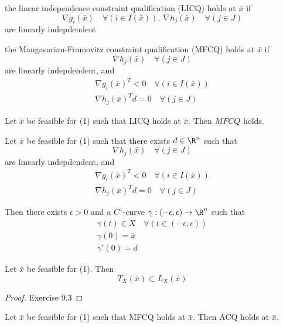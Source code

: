 \begin{enumerata}
	\item the linear independence constraint qualification (LICQ) holds
	at $\bar x$ if
	$$
		\nabla g_i(\bar x)\quad\forall(i\in I(\bar x)),\ \nabla h_j(\bar x)\quad\forall(j\in J)
	$$
	are linearly indepdendent
	\item the Mangasarian-Fromovitz constraint qualification (MFCQ)
	holds at $\bar x$ if
	$$
		\nabla h_j(\bar x)\quad\forall(j\in J)
	$$
	are linearly indepdendent, and
	\begin{gather*}
		\nabla g_i(\bar x)^T < 0  \quad\forall(i\in I(\bar x))\\
		\nabla h_j(\bar x)^Td = 0 \quad\forall(j\in J)
	\end{gather*}
\end{enumerata}

\label{a7ef3f5}

Let $\bar x$ be feasible for (1) such that LICQ holds at $\bar x$.
Then $MFCQ$ holds.

\label{a9bea04}

Let $\bar x$ be feasible for (1) such that there exists $d\in\R^n$
such that
$$
	\nabla h_j(\bar x)\quad\forall(j\in J)
$$
are linearly indepdendent, and
\begin{gather*}
	\nabla g_i(\bar x)^T < 0  \quad\forall(i\in I(\bar x))\\
	\nabla h_j(\bar x)^Td = 0 \quad\forall(j\in J)
\end{gather*}

Then there exists $\epsilon>0$ and a $C^1$-curve
$\gamma:(-\epsilon,\epsilon)\to\R^n$ such that
\begin{gather*}
	\gamma(t) \in X\quad\forall(t\in(-\epsilon,\epsilon)) \\
	\gamma(0) = \bar x \\
	\gamma'(0)=d
\end{gather*}


\label{a08cd35}

Let $\bar x$ be feasible for (1). Then
$$
	T_X(\bar x)\subset L_X(\bar x)
$$

\begin{proof}
	Exercise 9.3
\end{proof}

\label{eddce03}

Let $\bar x$ be feasible for (1) such that MFCQ holds at $\bar x$.
Then ACQ holds at $\bar x$.

